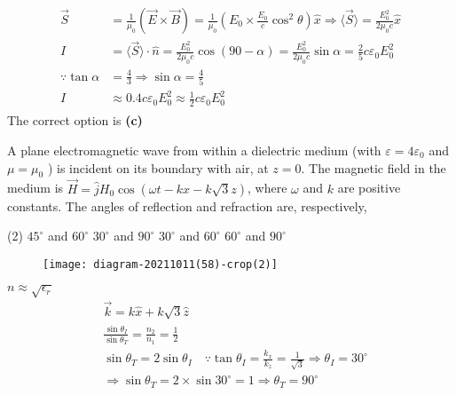 \begin{enumerate}
\begin{answer}
$$\begin{aligned}
\begin{aligned}
	\vec{S} &=\frac{1}{\mu_{0}}(\vec{E} \times \vec{B})=\frac{1}{\mu_{0}}\left(E_{0} \times \frac{E_{0}}{c} \cos ^{2} \theta\right) \hat{x} \Rightarrow\langle\vec{S}\rangle=\frac{E_{0}^{2}}{2 \mu_{0} c} \hat{x} \\
	I &=\langle\vec{S}\rangle \cdot \hat{n}=\frac{E_{0}^{2}}{2 \mu_{0} c} \cos (90-\alpha)=\frac{E_{0}^{2}}{2 \mu_{0} c} \sin \alpha=\frac{2}{5} c \varepsilon_{0} E_{0}^{2} \\
	\because \tan \alpha &=\frac{4}{3} \Rightarrow \sin \alpha=\frac{4}{5} \\
	I & \approx 0.4 c \varepsilon_{0} E_{0}^{2} \approx \frac{1}{2} c \varepsilon_{0} E_{0}^{2}
	\end{aligned}
	\end{aligned}$$	
	The correct option is \textbf{(c)}
\end{answer}
\begin{minipage}{\textwidth}
	\item A plane electromagnetic wave from within a dielectric medium (with $\varepsilon=4 \varepsilon_{0}$ and $\mu=\mu_{0}$ ) is incident on its boundary with air, at $z=0$. The magnetic field in the medium is $\vec{H}=\hat{j} H_{0} \cos (\omega t-k x-k \sqrt{3} z)$, where $\omega$ and $k$ are positive constants.
	The angles of reflection and refraction are, respectively,
\end{minipage}
\begin{tasks}(2)
	\task[\textbf{A.}] $45^{\circ}$ and $60^{\circ}$
	\task[\textbf{B.}]$30^{\circ}$ and $90^{\circ}$
	\task[\textbf{C.}]$30^{\circ}$ and $60^{\circ}$
	\task[\textbf{D.}]$60^{\circ}$ and $90^{\circ}$
\end{tasks}
\begin{answer}
	\begin{figure}[H]
		\centering
		\texttt{[image: diagram-20211011(58)-crop(2)]}
	\end{figure}
	$n \approx \sqrt{\epsilon_{r}}$
	$$
	\begin{aligned}
	&\vec{k}=k \hat{x}+k \sqrt{3} \hat{z} \\
	&\frac{\sin \theta_{I}}{\sin \theta_{T}}=\frac{n_{2}}{n_{1}}=\frac{1}{2} \\
	&\sin \theta_{T}=2 \sin \theta_{I} \quad \because \tan \theta_{I}=\frac{k_{x}}{k_{z}}=\frac{1}{\sqrt{3}} \Rightarrow \theta_{I}=30^{\circ} \\
	&\Rightarrow \sin \theta_{T}=2 \times \sin 30^{\circ}=1 \Rightarrow \theta_{T}=90^{\circ}
	\end{aligned}
$$
\end{answer}
\end{enumerate}
